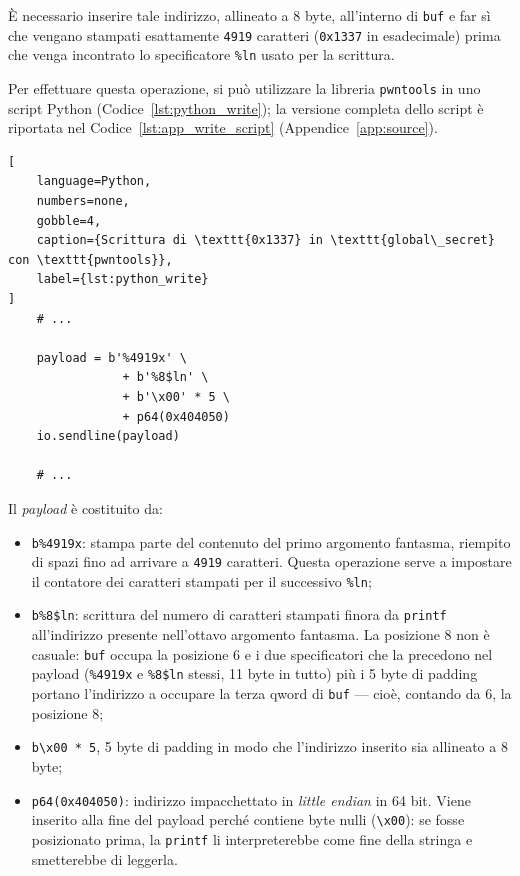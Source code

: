 È necessario inserire tale indirizzo, allineato a 8 byte, all'interno di \texttt{buf} e far sì che vengano stampati esattamente \texttt{4919} caratteri (\texttt{0x1337} in esadecimale) prima che venga incontrato lo specificatore \texttt{\%ln} usato per la scrittura.

Per effettuare questa operazione, si può utilizzare la libreria \texttt{pwntools} in uno script Python (Codice~\ref{lst:python_write}); la versione completa dello script è riportata nel Codice~\ref{lst:app_write_script} (Appendice~\ref{app:source}).
\begin{lstlisting}[
    language=Python,
    numbers=none,
    gobble=4,
    caption={Scrittura di \texttt{0x1337} in \texttt{global\_secret} con \texttt{pwntools}},
    label={lst:python_write}
]
    # ...

    payload = b'%4919x' \
                + b'%8$ln' \
                + b'\x00' * 5 \
                + p64(0x404050)
    io.sendline(payload)

    # ...
\end{lstlisting}
Il \emph{payload} è costituito da:
\begin{itemize}
    \item \texttt{b\textquotesingle\%4919x\textquotesingle}: stampa parte del contenuto del primo argomento fantasma, riempito di spazi fino ad arrivare a \texttt{4919} caratteri. Questa operazione serve a impostare il contatore dei caratteri stampati per il successivo \texttt{\%ln};
    \item \texttt{b\textquotesingle\%8\$ln\textquotesingle}: scrittura del numero di caratteri stampati finora da \texttt{printf} all'indirizzo presente nell'ottavo argomento fantasma. La posizione 8 non è casuale: \texttt{buf} occupa la posizione 6 e i due specificatori che la precedono nel payload (\texttt{\%4919x} e \texttt{\%8\$ln} stessi, 11 byte in tutto) più i 5 byte di padding portano l'indirizzo a occupare la terza qword di \texttt{buf} --- cioè, contando da 6, la posizione 8;
    \item \texttt{b\textquotesingle\textbackslash{}x00\textquotesingle{} * 5}, 5 byte di padding in modo che l'indirizzo inserito sia allineato a 8 byte;
    \item \texttt{p64(0x404050)}: indirizzo impacchettato in \emph{little endian} in 64 bit. Viene inserito alla fine del payload perché contiene byte nulli (\texttt{\textbackslash{}x00}): se fosse posizionato prima, la \texttt{printf} li interpreterebbe come fine della stringa e smetterebbe di leggerla.
\end{itemize}

